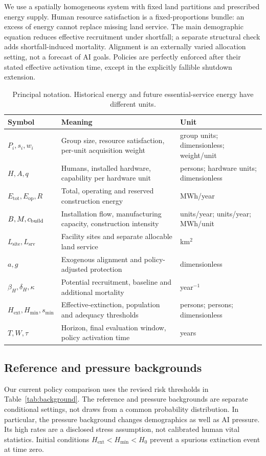 \documentclass[12pt,a4paper]{article}
\theoremstyle{remark}
\newcommand{\Etotal}{E_{\mathrm{tot}}}
\newcommand{\Eop}{E_{\mathrm{op}}}
\newcommand{\Hext}{H_{\mathrm{ext}}}
\newcommand{\Hmin}{H_{\min}}
\newcommand{\Lservice}{L_{\mathrm{srv}}}
\newcommand{\Lsite}{L_{\mathrm{site}}}
\begin{document}
We use a spatially homogeneous system with fixed land partitions and prescribed energy supply. Human resource satisfaction is a fixed-proportions bundle: an excess of energy cannot replace missing land service. The main demographic equation reduces effective recruitment under shortfall; a separate structural check adds shortfall-induced mortality. Alignment is an externally varied allocation setting, not a forecast of AI goals. Policies are perfectly enforced after their stated effective activation time, except in the explicitly fallible shutdown extension.

\begin{table}[htbp]\centering\small
\caption{Principal notation. Historical energy and future essential-service energy have different units.}\label{tab:notation}
\begin{tabularx}{\linewidth}{@{}lXl@{}}\toprule
Symbol & Meaning & Unit\\\midrule
$P_i,s_i,w_i$ & Group size, resource satisfaction, per-unit acquisition weight & group units; dimensionless; weight/unit\\
$H,A,q$ & Humans, installed hardware, capability per hardware unit & persons; hardware units; dimensionless\\
$\Etotal,\Eop,R$ & Total, operating and reserved construction energy & MWh/year\\
$B,M,c_{\rm build}$ & Installation flow, manufacturing capacity, construction intensity & units/year; units/year; MWh/unit\\
$\Lsite,\Lservice$ & Facility sites and separate allocable land service & km$^2$\\
$a,g$ & Exogenous alignment and policy-adjusted protection & dimensionless\\
$\beta_H,\delta_H,\kappa$ & Potential recruitment, baseline and additional mortality & year$^{-1}$\\
$\Hext,\Hmin,s_{\min}$ & Effective-extinction, population and adequacy thresholds & persons; persons; dimensionless\\
$T,W,\tau$ & Horizon, final evaluation window, policy activation time & years\\\bottomrule
\end{tabularx}
\end{table}

\subsection{Reference and pressure backgrounds}
Our current policy comparison uses the revised risk thresholds in Table~\ref{tab:background}. The reference and pressure backgrounds are separate conditional settings, not draws from a common probability distribution. In particular, the pressure background changes demographics as well as AI pressure. Its high rates are a disclosed stress assumption, not calibrated human vital statistics. Initial conditions $\Hext<\Hmin<H_0$ prevent a spurious extinction event at time zero.
\end{document}
